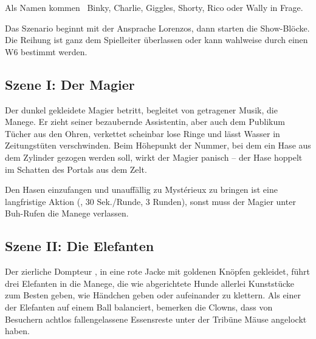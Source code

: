 {		

		\noindent
		Als Namen kommen \zB~Binky, Charlie, Giggles, Shorty, Rico oder Wally in Frage.


		\noindent
		Das Szenario beginnt mit der Ansprache Lorenzos, dann starten die Show-Blöcke. Die Reihung ist ganz dem Spielleiter überlassen oder kann wahlweise durch einen W6 bestimmt werden.

		\subsection{Szene I: Der Magier}

		Der dunkel gekleidete Magier  betritt, begleitet von getragener Musik, die Manege. Er zieht seiner bezaubernde Assistentin, aber auch dem Publikum Tücher aus den Ohren, verkettet scheinbar lose Ringe und lässt Wasser in Zeitungstüten verschwinden. Beim Höhepunkt der Nummer, bei dem ein Hase aus dem Zylinder gezogen werden soll, wirkt der Magier panisch -- der Hase  hoppelt im Schatten des Portals aus dem Zelt.

		Den Hasen einzufangen und unauffällig zu Mystérieux zu bringen ist eine langfristige Aktion (, 30 Sek./Runde, 3 Runden), sonst muss der Magier unter Buh-Rufen die Manege verlassen.

		\subsection{Szene II: Die Elefanten}

		Der zierliche Dompteur , in eine rote Jacke mit goldenen Knöpfen gekleidet, führt drei Elefanten in die Manege, die wie abgerichtete Hunde allerlei Kunststücke zum Besten geben, wie Händchen geben oder aufeinander zu klettern. Als einer der Elefanten auf einem Ball balanciert, bemerken die Clowns, dass von Besuchern achtlos fallengelassene Essensreste unter der Tribüne Mäuse angelockt haben.

}
